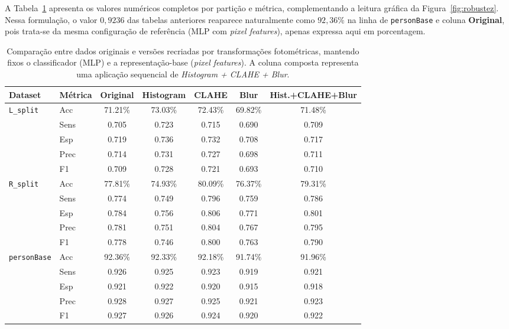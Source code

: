 \documentclass[11pt,a4paper]{article}
\begin{document}
A Tabela~\ref{tab:original-vs-recriado} apresenta os valores numéricos completos por partição e métrica, complementando a leitura gráfica da Figura~\ref{fig:robustez}. Nessa formulação, o valor \(0{,}9236\) das tabelas anteriores reaparece naturalmente como \(92{,}36\%\) na linha de \texttt{personBase} e coluna \textbf{Original}, pois trata-se da mesma configuração de referência (MLP com \textit{pixel features}), apenas expressa aqui em porcentagem.

\begin{table}[htbp]
\centering
\caption{Comparação entre dados originais e versões recriadas por transformações fotométricas, mantendo fixos o classificador (MLP) e a representação-base (\emph{pixel features}). A coluna composta representa uma aplicação sequencial de \emph{Histogram + CLAHE + Blur}.}
\label{tab:original-vs-recriado}
\scriptsize
\setlength{\tabcolsep}{3pt}
\renewcommand{\arraystretch}{1.10}
\begin{tabular}{llccccc}
\toprule
\textbf{Dataset} & \textbf{Métrica} & \textbf{Original} & \textbf{Histogram} & \textbf{CLAHE} & \textbf{Blur} & \textbf{Hist.+CLAHE+Blur} \\
\midrule
\texttt{L\_split} & Acc  & 71.21\% & 73.03\% & 72.43\% & 69.82\% & 71.48\% \\
                  & Sens & 0.705   & 0.723   & 0.715   & 0.690   & 0.709 \\
                  & Esp  & 0.719   & 0.736   & 0.732   & 0.708   & 0.717 \\
                  & Prec & 0.714   & 0.731   & 0.727   & 0.698   & 0.711 \\
                  & F1   & 0.709   & 0.728   & 0.721   & 0.693   & 0.710 \\
\addlinespace[2pt]

\texttt{R\_split} & Acc  & 77.81\% & 74.93\% & 80.09\% & 76.37\% & 79.31\% \\
                  & Sens & 0.774   & 0.749   & 0.796   & 0.759   & 0.786 \\
                  & Esp  & 0.784   & 0.756   & 0.806   & 0.771   & 0.801 \\
                  & Prec & 0.781   & 0.751   & 0.804   & 0.767   & 0.795 \\
                  & F1   & 0.778   & 0.746   & 0.800   & 0.763   & 0.790 \\
\addlinespace[2pt]

\texttt{personBase} & Acc  & 92.36\% & 92.33\% & 92.18\% & 91.74\% & 91.96\% \\
                    & Sens & 0.926   & 0.925   & 0.923   & 0.919   & 0.921 \\
                    & Esp  & 0.921   & 0.922   & 0.920   & 0.915   & 0.918 \\
                    & Prec & 0.928   & 0.927   & 0.925   & 0.921   & 0.923 \\
                    & F1   & 0.927   & 0.926   & 0.924   & 0.920   & 0.922 \\
\bottomrule
\end{tabular}
\end{table}
\end{document}
